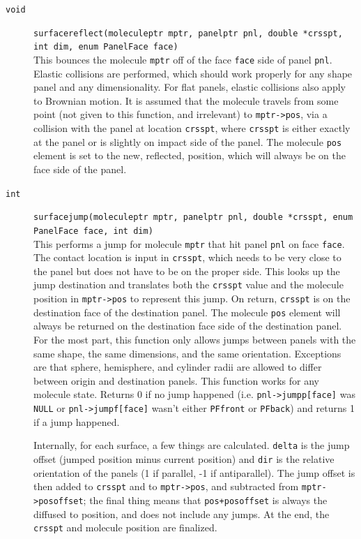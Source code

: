 \documentclass {scrbook}
\newcommand {\ttt} {\texttt}
\begin{document}
\begin{description}
\item[\ttt{void}]
\ttt{surfacereflect(moleculeptr mptr, panelptr pnl, double *crsspt, int dim, enum PanelFace face)}
\hfill \\
This bounces the molecule \ttt{mptr} off of the face \ttt{face} side of panel \ttt{pnl}. Elastic collisions are performed, which should work properly for any shape panel and any dimensionality. For flat panels, elastic collisions also apply to Brownian motion. It is assumed that the molecule travels from some point (not given to this function, and irrelevant) to \ttt{mptr->pos}, via a collision with the panel at location \ttt{crsspt}, where \ttt{crsspt} is either exactly at the panel or is slightly on impact side of the panel. The molecule \ttt{pos} element is set to the new, reflected, position, which will always be on the face side of the panel.

\item[\ttt{int}]
\ttt{surfacejump(moleculeptr mptr, panelptr pnl, double *crsspt, enum PanelFace face, int dim)}
\hfill \\
This performs a jump for molecule \ttt{mptr} that hit panel \ttt{pnl} on face \ttt{face}. The contact location is input in \ttt{crsspt}, which needs to be very close to the panel but does not have to be on the proper side. This looks up the jump destination and translates both the \ttt{crsspt} value and the molecule position in \ttt{mptr->pos} to represent this jump. On return, \ttt{crsspt} is on the destination face of the destination panel. The molecule \ttt{pos} element will always be returned on the destination face side of the destination panel. For the most part, this function only allows jumps between panels with the same shape, the same dimensions, and the same orientation. Exceptions are that sphere, hemisphere, and cylinder radii are allowed to differ between origin and destination panels. This function works for any molecule state. Returns 0 if no jump happened (i.e. \ttt{pnl->jumpp[face]} was \ttt{NULL} or \ttt{pnl->jumpf[face]} wasn't either \ttt{PFfront} or \ttt{PFback}) and returns 1 if a jump happened.

Internally, for each surface, a few things are calculated. \ttt{delta} is the jump offset (jumped position minus current position) and \ttt{dir} is the relative orientation of the panels (1 if parallel, -1 if antiparallel). The jump offset is then added to \ttt{crsspt} and to \ttt{mptr->pos}, and subtracted from \ttt{mptr->posoffset}; the final thing means that \ttt{pos+posoffset} is always the diffused to position, and does not include any jumps. At the end, the \ttt{crsspt} and molecule position are finalized.


\end{description}
\end{document}
